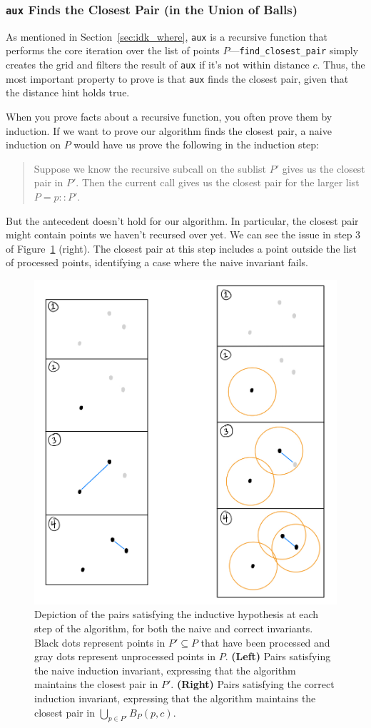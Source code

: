 \documentclass{article}
\begin{document}
\subsubsection{{\large\texttt{aux}} Finds the Closest Pair (in the Union of Balls)}\label{sec:change_ih}

As mentioned in Section~\ref{sec:idk_where}, \texttt{aux} is a recursive function that performs the core iteration over the list of points $P$---\texttt{find\_closest\_pair} simply creates the grid and filters the result of \texttt{aux} if it's not within distance $c$.
Thus, the most important property to prove is that \texttt{aux} finds the closest pair, given that the distance hint holds true.

When you prove facts about a recursive function, you often prove them by induction.
If we want to prove our algorithm finds the closest pair, a naive induction on $P$ would have us prove the following in the induction step:
\begin{quote}
  Suppose we know the recursive subcall on the sublist $P'$ gives us the closest pair in $P'$.
  Then the current call gives us the closest pair for the larger list $P = p :: P'$.
\end{quote}
But the antecedent doesn't hold for our algorithm.
In particular, the closest pair might contain points we haven't recursed over yet.
We can see the issue in step 3 of Figure~\ref{fig:aux_invariant} (right).
The closest pair at this step includes a point outside the list of processed points, identifying a case where the naive invariant fails.
\begin{figure}[H]\label{fig:aux_invariant}
  \begin{center}
  \includegraphics[width=0.5\linewidth]{res/aux_invariant}
  \end{center}
  \caption{
    Depiction of the pairs satisfying the inductive hypothesis at each step of the algorithm, for both the naive and correct invariants.
    Black dots represent points in $P' \subseteq P$ that have been processed and gray dots represent unprocessed points in $P$.
    \textbf{(Left)}
      Pairs satisfying the naive induction invariant, expressing that the algorithm maintains the closest pair in $P'$.
    \textbf{(Right)}
      Pairs satisfying the correct induction invariant, expressing that the algorithm maintains the closest pair in $\bigcup_{p \in P'}B_P(p, c)$.
  }
\end{figure}
\end{document}
